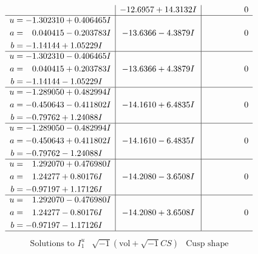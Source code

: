 \documentclass[1p]{elsarticle_modified}
\theoremstyle{definition}
\newcommand{\I}{\sqrt{-1}}
\begin{document}
$$\begin{array}{c|c|c}
 & -12.6957 + 14.3132 I & \phantom{-0.000000 } 0 \\ \hline\begin{aligned}
u &= -1.302310 + 0.406465 I \\
a &= \phantom{-}0.040415 - 0.203783 I \\
b &= -1.14144 + 1.05229 I\end{aligned}
 & -13.6366 - 4.3879 I & \phantom{-0.000000 } 0 \\ \hline\begin{aligned}
u &= -1.302310 - 0.406465 I \\
a &= \phantom{-}0.040415 + 0.203783 I \\
b &= -1.14144 - 1.05229 I\end{aligned}
 & -13.6366 + 4.3879 I & \phantom{-0.000000 } 0 \\ \hline\begin{aligned}
u &= -1.289050 + 0.482994 I \\
a &= -0.450643 - 0.411802 I \\
b &= -0.79762 + 1.24088 I\end{aligned}
 & -14.1610 + 6.4835 I & \phantom{-0.000000 } 0 \\ \hline\begin{aligned}
u &= -1.289050 - 0.482994 I \\
a &= -0.450643 + 0.411802 I \\
b &= -0.79762 - 1.24088 I\end{aligned}
 & -14.1610 - 6.4835 I & \phantom{-0.000000 } 0 \\ \hline\begin{aligned}
u &= \phantom{-}1.292070 + 0.476980 I \\
a &= \phantom{-}1.24277 + 0.80176 I \\
b &= -0.97197 + 1.17126 I\end{aligned}
 & -14.2080 - 3.6508 I & \phantom{-0.000000 } 0 \\ \hline\begin{aligned}
u &= \phantom{-}1.292070 - 0.476980 I \\
a &= \phantom{-}1.24277 - 0.80176 I \\
b &= -0.97197 - 1.17126 I\end{aligned}
 & -14.2080 + 3.6508 I & \phantom{-0.000000 } 0\\
 \hline 
 \end{array}$$\newpage$$\begin{array}{c|c|c}  
\text{Solutions to }I^u_{1}& \I (\text{vol} + \sqrt{-1}CS) & \text{Cusp shape}\\

\end{array}$$
\end{document}
